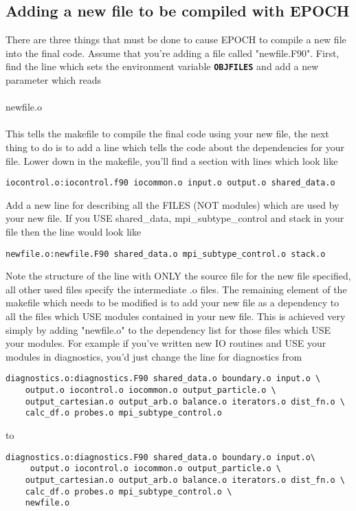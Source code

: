 \documentclass[12pt]{article}
\newcommand{\simpleboxverbatim}{\begin{Verbatim}[obeytabs=true,frame=single,
  framerule=0.5mm,rulecolor=\color{warwickmid}]}
\newcommand{\inlinecode}[1]{{\color{warwickred} \bf\texttt{#1}}}
\newcommand{\nEPOCH}{{\color{warwickdark}\fontfamily{phv}\selectfont EPOCH}}
\newcommand{\EPOCH}{{\nEPOCH} }
\begin{document}
\subsection{Adding a new file to be compiled with \EPOCH}
There are three things that must be done to cause \EPOCH to compile a new file
into the final code. Assume that you're adding a file called
"newfile.F90". First, find the line which sets the environment variable
\inlinecode{OBJFILES} and add a new parameter which reads\\
\\
newfile.o\\
\\ This tells the makefile to compile the final code using your new file, the
next thing to do is to add a line which tells the code about the dependencies
for your file. Lower down in the makefile, you'll find a section with lines
which look like
\simpleboxverbatim
iocontrol.o:iocontrol.f90 iocommon.o input.o output.o shared_data.o
\end{Verbatim}
Add a new line for describing all the FILES (NOT modules) which are used by
your new file. If you USE shared\_data, mpi\_subtype\_control and stack in
your file then the line would look like
\simpleboxverbatim
newfile.o:newfile.F90 shared_data.o mpi_subtype_control.o stack.o
\end{Verbatim}
Note the structure of the line with ONLY the source file for the new file
specified, all other used files specify the intermediate .o files. The
remaining element of the makefile which needs to be modified is to add your
new file as a dependency to all the files which USE modules contained in your
new file. This is achieved very simply by adding "newfile.o" to the dependency
list for those files which USE your modules. For example if you've written new
IO routines and USE your modules in diagnostics, you'd just change the line
for diagnostics from

\simpleboxverbatim
diagnostics.o:diagnostics.F90 shared_data.o boundary.o input.o \
	output.o iocontrol.o iocommon.o output_particle.o \
	output_cartesian.o output_arb.o balance.o iterators.o dist_fn.o \
	calc_df.o probes.o mpi_subtype_control.o
\end{Verbatim}
to
\simpleboxverbatim
diagnostics.o:diagnostics.F90 shared_data.o boundary.o input.o\
	 output.o iocontrol.o iocommon.o output_particle.o \
	output_cartesian.o output_arb.o balance.o iterators.o dist_fn.o \
	calc_df.o probes.o mpi_subtype_control.o \
	newfile.o
\end{Verbatim}
\end{document}
